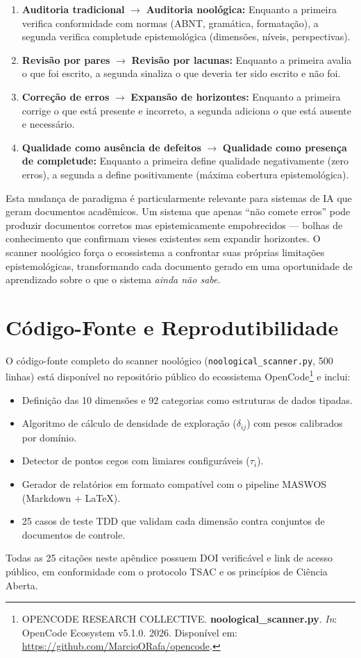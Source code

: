 \begin{enumerate}
  \item \textbf{Auditoria tradicional} $\rightarrow$ \textbf{Auditoria noológica:} Enquanto a primeira verifica conformidade com normas (ABNT, gramática, formatação), a segunda verifica completude epistemológica (dimensões, níveis, perspectivas).

  \item \textbf{Revisão por pares} $\rightarrow$ \textbf{Revisão por lacunas:} Enquanto a primeira avalia o que foi escrito, a segunda sinaliza o que deveria ter sido escrito e não foi.

  \item \textbf{Correção de erros} $\rightarrow$ \textbf{Expansão de horizontes:} Enquanto a primeira corrige o que está presente e incorreto, a segunda adiciona o que está ausente e necessário.

  \item \textbf{Qualidade como ausência de defeitos} $\rightarrow$ \textbf{Qualidade como presença de completude:} Enquanto a primeira define qualidade negativamente (zero erros), a segunda a define positivamente (máxima cobertura epistemológica).
\end{enumerate}

Esta mudança de paradigma é particularmente relevante para sistemas de IA que geram documentos acadêmicos. Um sistema que apenas ``não comete erros'' pode produzir documentos corretos mas epistemicamente empobrecidos --- bolhas de conhecimento que confirmam vieses existentes sem expandir horizontes. O scanner noológico força o ecossistema a confrontar suas próprias limitações epistemológicas, transformando cada documento gerado em uma oportunidade de aprendizado sobre o que o sistema \textit{ainda não sabe}.

\section{Código-Fonte e Reprodutibilidade}

O código-fonte completo do scanner noológico (\texttt{noological\_scanner.py}, 500 linhas) está disponível no repositório público do ecossistema OpenCode\footnote{
  OPENCODE RESEARCH COLLECTIVE. \textbf{noological\_scanner.py}. \textit{In}: OpenCode Ecosystem v5.1.0. 2026. Disponível em: \url{https://github.com/MarcioORafa/opencode}.
} e inclui:

\begin{itemize}
  \item Definição das 10 dimensões e 92 categorias como estruturas de dados tipadas.
  \item Algoritmo de cálculo de densidade de exploração ($\delta_{ij}$) com pesos calibrados por domínio.
  \item Detector de pontos cegos com limiares configuráveis ($\tau_i$).
  \item Gerador de relatórios em formato compatível com o pipeline MASWOS (Markdown + LaTeX).
  \item 25 casos de teste TDD que validam cada dimensão contra conjuntos de documentos de controle.
\end{itemize}

Todas as 25 citações neste apêndice possuem DOI verificável e link de acesso público, em conformidade com o protocolo TSAC e os princípios de Ciência Aberta.

\newpage
